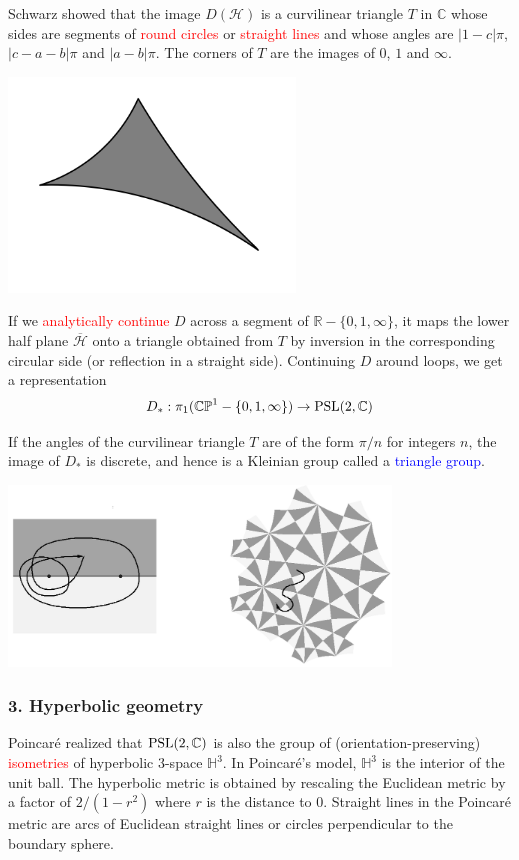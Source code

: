\documentclass{beamer}
\def\R{\mathbb{R}}
\def\H{\mathbb{H}}
\def\HH{\mathcal{H}}
\def\CP{\mathbb{CP}}
\def\C{\mathbb{C}}
\def\PSL{\textnormal{PSL}}
\begin{document}
{
Schwarz showed that the image $D(\HH)$ is a \textcolor{dgreen}{curvilinear triangle} $T$ in $\C$
whose sides are segments of \textcolor{red}{round circles} or \textcolor{red}{straight lines}
and whose angles are $|1-c|\pi$, $|c-a-b|\pi$ and $|a-b|\pi$.
\vskip 10pt
The corners of $T$ are the images of $0$, $1$ and $\infty$.
\begin{center}
\includegraphics[width=3in]{Schwarz_triangle.png}
\end{center}
}
\frame
{
If we \textcolor{red}{analytically continue} $D$ across a segment of 
$\R - \lbrace 0,1,\infty\rbrace$, it maps
the lower half plane $\overline{\HH}$ onto a triangle obtained from $T$ by \textcolor{dgreen}{inversion}
in the corresponding circular side (or \textcolor{dgreen}{reflection} in a straight side).
\vskip 10pt
Continuing $D$ around loops, we get a
representation 
$$D_*:\pi_1(\CP^1 - \lbrace 0,1,\infty\rbrace) \to \PSL(2,\C)$$ 
}
\frame
{
If the angles of the curvilinear triangle $T$ are of the form $\pi/n$ for integers $n$, 
the image of $D_*$ is discrete, and hence is a Kleinian group
called a \textcolor{blue}{triangle group}.
\begin{center}
\includegraphics[width=4in]{triangle_group.png}
\end{center}
}
\frame
{
\frametitle{3. Hyperbolic geometry}
Poincar\'e realized that $\PSL(2,\C)$ is also the group
of (orientation-preserving) \textcolor{red}{isometries} of hyperbolic 3-space $\H^3$.
\vskip 10pt
In Poincar\'e's model, $\H^3$ is the interior of the unit ball.
The hyperbolic metric is obtained by rescaling the Euclidean metric
by a factor of $2/(1-r^2)$ where $r$ is the distance to $0$.
\vskip 10pt
Straight lines in the Poincar\'e metric are arcs of Euclidean
straight lines or circles perpendicular to the boundary sphere.
}
\end{document}
